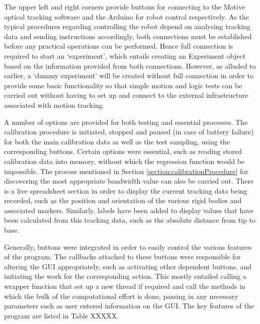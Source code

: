 \documentclass[11pt]{article}
\begin{document}
The upper left and right corners provide buttons for connecting to the Motive optical tracking software and the Arduino for robot control respectively. As the typical procedures regarding controlling the robot depend on analysing tracking data and sending instructions accordingly, both connections must be established before any practical operations can be performed. Hence full connection is required to start an `experiment', which entails creating an Experiment object based on the information provided from both connections. However, as alluded to earlier, a `dummy experiment' will be created without full connection in order to provide some basic functionality so that simple motion and logic tests can be carried out without having to set up and connect to the external infrastructure associated with motion tracking. 

A number of options are provided for both testing and essential processes. The calibration procedure is initiated, stopped and paused (in case of battery failure) for both the main calibration data as well as the test sampling, using the corresponding buttons. Certain options were essential, such as reading stored calibration data into memory, without which the regression function would be impossible. The process mentioned in Section \ref{section:calibrationProcedure} for discovering the most appropriate bandwidth value can also be carried out. There is a live spreadsheet section in order to display the current tracking data being recorded, such as the position and orientation of the various rigid bodies and associated markers. Similarly, labels have been added to display values that have been calculated from this tracking data, such as the absolute distance from tip to base. 

Generally, buttons were integrated in order to easily control the various features of the program. The callbacks attached to these buttons were responsible for altering the GUI appropriately, such as activating other dependent buttons, and initiating the work for the corresponding action. This mostly entailed calling a wrapper function that set up a new thread if required and call the methods in which the bulk of the computational effort is done, passing in any necessary parameters such as user entered information on the GUI. The key features of the program are listed in Table XXXXX.

\pagebreak
\end{document}
